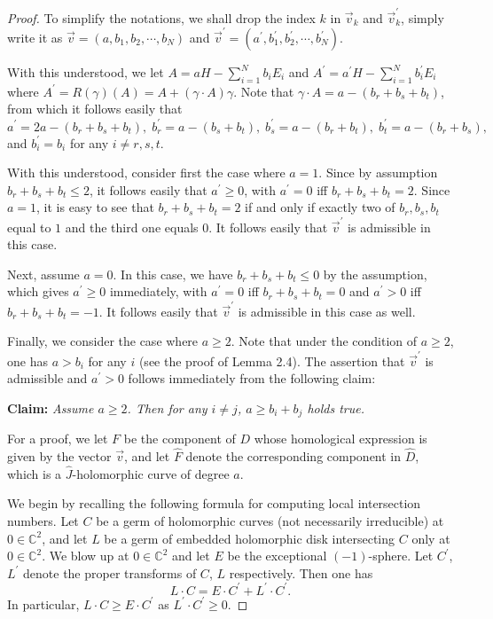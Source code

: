 \documentclass[10pt,a4paper]{amsart}
\newcommand{\C}{{\mathbb C}}
\begin{document}
\begin{proof}
To simplify the notations, we shall drop the index $k$ in $\vec{v}_k$ and $\vec{v}_k^\prime$, simply write it as 
$\vec{v}=(a,b_{1},b_{2}, \cdots, b_{N})$ and $\vec{v}^\prime=(a^\prime,b_{1}^\prime,b_{2}^\prime, \cdots, 
b_{N}^\prime)$.

With this understood, we let $A=aH-\sum_{i=1}^N b_iE_i$ and $A^\prime=a^\prime H-\sum_{i=1}^N b_i^\prime E_i$
where $A^\prime=R(\gamma)(A)=A+(\gamma\cdot A)\gamma$. Note that 
$\gamma\cdot A=a-(b_r+b_s+b_t)$, from which it follows easily that
$$
a^\prime=2a-(b_r+b_s+b_t), \; b_r^\prime=a-(b_s+b_t), \; b_s^\prime=a-(b_r+b_t), \; b_t^\prime=a-(b_r+b_s),
$$
and $b_i^\prime=b_i$ for any $i\neq r,s,t$.

With this understood, consider first the case where $a=1$. Since by assumption $b_{r}+b_{s}+b_{t}\leq 2$, 
it follows easily that $a^\prime\geq 0$, with $a^\prime= 0$ iff $b_{r}+b_{s}+b_{t}=2$. Since $a=1$, it is easy to see
that $b_{r}+b_{s}+b_{t}=2$ if and only if exactly two of $b_{r}, b_{s},b_{t}$ equal to $1$ and the third one equals $0$. It follows easily that $\vec{v}^\prime$ is admissible in this case. 

Next, assume $a=0$. In this case, we have  $b_{r}+b_{s}+b_{t}\leq 0$ by the assumption, which gives 
$a^\prime\geq 0$ immediately,  with $a^\prime= 0$ iff $b_{r}+b_{s}+b_{t}=0$ and $a^\prime>0$  
iff $b_{r}+b_{s}+b_{t}=-1$. It follows easily that $\vec{v}^\prime$ is admissible in this case as well.

Finally, we consider the case where $a\geq 2$. Note that under the condition of $a\geq 2$, one has $a>b_i$ 
for any $i$ (see the proof of Lemma 2.4). The assertion that $\vec{v}^\prime$ is admissible and $a^\prime>0$
follows immediately from the following claim:

\vspace{1mm}

{\bf Claim:} {\it Assume $a\geq 2$. Then for any $i\neq j$, $a\geq b_{i}+b_{j}$ holds true.}

\vspace{1mm}

For a proof, we let $F$ be the component of $D$ whose homological expression is given by the vector 
$\vec{v}$, and let $\hat{F}$ denote the corresponding component in $\hat{D}$, which is a $\hat{J}$-holomorphic curve of degree $a$. 

We begin by recalling the following formula for computing local intersection numbers. Let $C$ be a germ of holomorphic curves (not necessarily irreducible) at $0\in \C^2$, and let $L$ be a germ of embedded holomorphic disk intersecting $C$ only at $0\in \C^2$. We blow up at $0\in \C^2$ and let $E$ be the exceptional $(-1)$-sphere. Let $C^\prime$, $L^\prime$ denote the proper transforms of $C$, $L$ respectively. Then one has
$$
L\cdot C=E\cdot C^\prime+L^\prime\cdot C^\prime. 
$$
In particular, $L\cdot C\geq E\cdot C^\prime$ as $L^\prime\cdot C^\prime\geq 0$. 


\end{proof}
\end{document}
